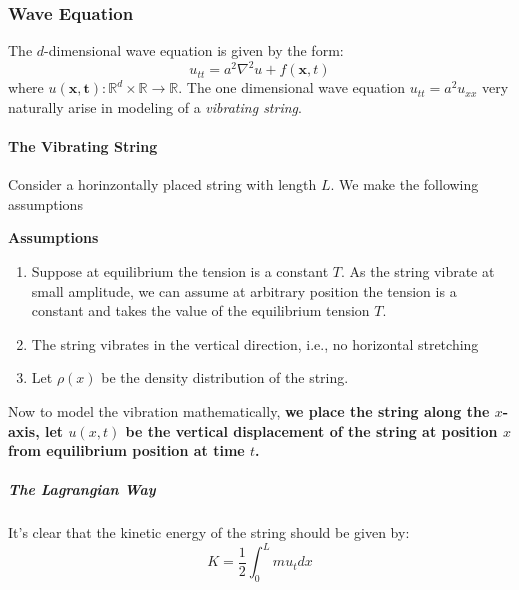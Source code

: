 \subsubsection{Wave Equation}

The $d$-dimensional wave equation is given by the form:
\begin{equation}
u_{tt} = a^2 \nabla^2 u + f(\mathbf{x},t)
\end{equation}
where $u(\mathbf{x,t}): \mathbb{R}^d\times \mathbb{R}\to \mathbb{R}$.\newline
The one dimensional wave equation $u_{tt}=a^2u_{xx}$ very naturally arise in modeling of a \textit{vibrating string}.

\paragraph{The Vibrating String}

Consider a horinzontally placed string with length $L$. We make the following assumptions

\begin{framed}
\textbf{Assumptions}\\
\begin{enumerate}
\item Suppose at equilibrium the tension is a constant $T$. As the string vibrate at small amplitude, we can assume at arbitrary  position the tension is a constant and takes the value of the equilibrium tension $T$.
\item The string vibrates in the vertical direction, i.e., no horizontal stretching
\item Let $\rho(x)$ be the density distribution of the string.
\end{enumerate}
\end{framed}

Now to model the vibration mathematically, \textbf{we place the string along the $x$-axis, let $u(x,t)$ be the vertical displacement of the string at position $x$ from equilibrium position at time $t$.}

\subparagraph{The Lagrangian Way}

It's clear that the kinetic energy of the string should be given by:
\begin{equation}
K=\frac{1}{2}\int_0^L mu_tdx
\end{equation}